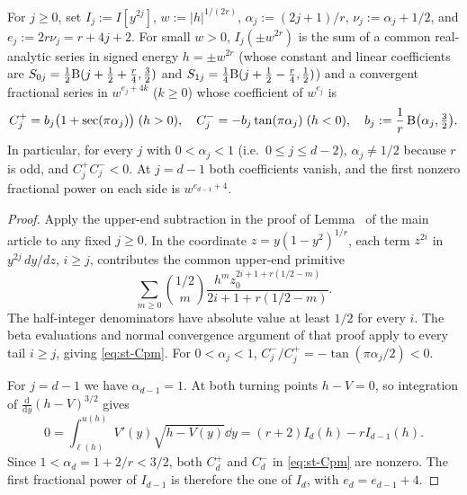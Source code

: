 \begin{lemma}\label{lem:st-expansion}
For $j\ge 0$, set $I_j:=I[y^{2j}]$, $w:=|h|^{1/(2r)}$, $\alpha_j:=(2j+1)/r$, $\nu_j:=\alpha_j+1/2$, and $e_j:=2r\nu_j=r+4j+2$. For small $w>0$, $I_j(\pm w^{2r})$ is the sum of a common real-analytic series in signed energy $h=\pm w^{2r}$ (whose constant and linear coefficients are $S_{0j}=\frac{1}{2}\mathrm{B}(j+\frac{1}{2}+\frac{r}{4},\frac{3}{2})$ and $S_{1j}=\frac{1}{4}\mathrm{B}(j+\frac{1}{2}-\frac{r}{4},\frac{1}{2})$) and a convergent fractional series in $w^{e_j+4k}$ ($k\ge 0$) whose coefficient of $w^{e_j}$ is
\begin{equation}\label{eq:st-Cpm}
  C_j^+ = b_j\bigl(1+\sec(\pi\alpha_j)\bigr) \; (h>0), \quad
  C_j^- = -b_j\tan(\pi\alpha_j) \; (h<0), \quad
  b_j := \frac{1}{r}\,\mathrm{B}\bigl(\alpha_j,\tfrac{3}{2}\bigr).
\end{equation}
In particular, for every $j$ with $0<\alpha_j<1$ (i.e.\ $0\le j\le d-2$), $\alpha_j\ne 1/2$ because $r$ is odd, and $C_j^+ C_j^- < 0$. At $j=d-1$ both coefficients vanish, and the first nonzero fractional power on each side is $w^{e_{d-1}+4}$.
\end{lemma}

\begin{proof}
Apply the upper-end subtraction in the proof of Lemma~ of the main article to any fixed \(j\ge0\). In the coordinate \(z=y(1-y^2)^{1/r}\), each term \(z^{2i}\) in \(y^{2j}\,dy/dz\), \(i\ge j\), contributes the common upper-end primitive
\begin{equation}\label{eq:st-upper-series}
 \sum_{m\ge0}\binom{1/2}{m}\frac{h^m z_0^{2i+1+r(1/2-m)}}{2i+1+r(1/2-m)} .
\end{equation}
The half-integer denominators have absolute value at least \(1/2\) for every \(i\). The beta evaluations and normal convergence argument of that proof apply to every tail \(i\ge j\), giving \eqref{eq:st-Cpm}. For \(0<\alpha_j<1\), \(C_j^-/C_j^+=-\tan(\pi\alpha_j/2)<0\).

For \(j=d-1\) we have \(\alpha_{d-1}=1\). At both turning points \(h-V=0\), so integration of \(\frac{\mathrm d}{\mathrm dy}(h-V)^{3/2}\) gives
\[
 0=\int_{\ell(h)}^{u(h)} V'(y)\sqrt{h-V(y)}\dd y=(r+2)I_d(h)-rI_{d-1}(h).
\]
Since \(1<\alpha_d=1+2/r<3/2\), both \(C_d^+\) and \(C_d^-\) in \eqref{eq:st-Cpm} are nonzero. The first fractional power of \(I_{d-1}\) is therefore the one of \(I_d\), with \(e_d=e_{d-1}+4\).
\end{proof}

